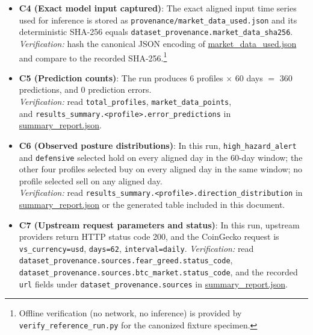 \documentclass[12pt,a4paper]{report}
\begin{document}
\begin{itemize}
\pagebreak

	\item \textbf{C4 (Exact model input captured)}: The exact aligned input time series used for inference is stored as \texttt{provenance/market\_data\_used.json} and its deterministic SHA-256 equals \texttt{dataset\_provenance.market\_data\_sha256}. \\
	\emph{Verification:} hash the canonical JSON encoding of \href{https://github.com/jhcragin/SpiralBrain-v3.0-public/blob/main/market_emotion_risk_posture/results/provenance/market_data_used.json}{market_data_used.json} and compare to the recorded SHA-256.\footnote{Offline verification (no network, no inference) is provided by \texttt{verify\_reference\_run.py} for the canonized fixture specimen.}

	\item \textbf{C5 (Prediction counts)}: The run produces 6 profiles $\times$ 60 days $=$ 360 predictions, and 0 prediction errors. \\
	\emph{Verification:} read \texttt{total\_profiles}, \texttt{market\_data\_points}, \\
    and \texttt{results\_summary.<profile>.error\_predictions} in \href{https://github.com/jhcragin/SpiralBrain-v3.0-public/blob/main/market_emotion_risk_posture/results/summary_report.json}{summary_report.json}.

	\item \textbf{C6 (Observed posture distributions)}: In this run, \texttt{high\_hazard\_alert} and \texttt{defensive} selected hold on every aligned day in the 60-day window; the other four profiles selected buy on every aligned day in the same window; no profile selected sell on any aligned day. \\
	\emph{Verification:} read \texttt{results\_summary.<profile>.direction\_distribution} in \href{https://github.com/jhcragin/SpiralBrain-v3.0-public/blob/main/market_emotion_risk_posture/results/summary_report.json}{summary_report.json} or the generated table included in this document.

	\item \textbf{C7 (Upstream request parameters and status)}: In this run, upstream providers return HTTP status code 200, and the CoinGecko request is \texttt{vs\_currency=usd}, \texttt{days=62}, \texttt{interval=daily}.
	\emph{Verification:} read \\ \texttt{dataset\_provenance.sources.fear\_greed.status\_code}, \\ \texttt{dataset\_provenance.sources.btc\_market.status\_code}, and the recorded \texttt{url} fields under \texttt{dataset\_provenance.sources} in \href{https://github.com/jhcragin/SpiralBrain-v3.0-public/blob/main/market_emotion_risk_posture/results/summary_report.json}{summary_report.json}.
\end{itemize}
\end{document}
